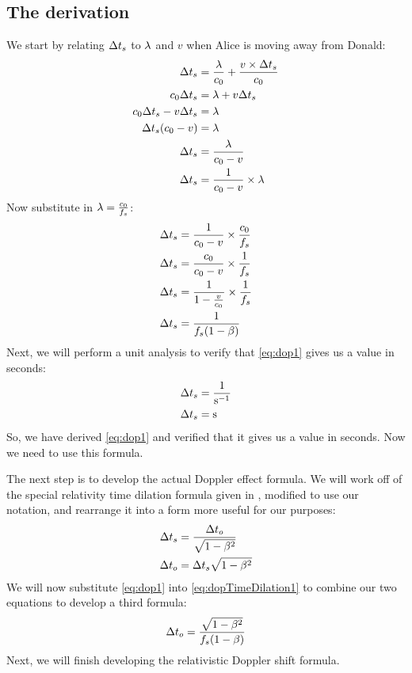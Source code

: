 	\subsection{The derivation}
		We start by relating $\mathrm{\Delta} t_s$ to $\mathrm{\lambda}$ and $v$ when Alice is moving away from Donald:
		\begin{align*}
			\Del t_s &= \frac{\lam}{\si{\clight}} + \frac{v \times \Del t_s}{\si{\clight}}\\
			\si{\clight} \Del t_s &= \lam + v\Del t_s\\
			\si{\clight} \Del t_s - v\Delta t_s &= \lam\\
			\Del t_s (\si{\clight} - v) &= \lam\\
			\Del t_s &= \frac{\lam}{\si{\clight} - v}\\
			\Del t_s &= \frac{1}{\si{\clight} - v} \times \lam
		\end{align*}
		Now substitute in $\lam = \frac{\si{\clight}}{f_s}$:
		\begin{align}
			\Del t_s &= \frac{1}{\si{\clight} - v} \times \frac{\si{\clight}}{f_s}\nonumber\\
			\Del t_s &= \frac{\si{\clight}}{\si{\clight} - v} \times \frac{1}{f_s}\nonumber\\
			\Del t_s &= \frac{1}{1 - \frac{v}{\si{\clight}}} \times \frac{1}{f_s}\nonumber\\
			\Del t_s &= \frac{1}{f_s(1 - \beta)}\label{eq:dop1}
		\end{align}
		Next, we will perform a unit analysis to verify that \eqref{eq:dop1} gives us a value in seconds:
		\begin{align*}
			\mathrm{\Delta} t_s &= \frac{1}{\si{\per\second}}\\
			\mathrm{\Delta} t_s &= \si{\second}
		\end{align*}
		So, we have derived \eqref{eq:dop1} and verified that it gives us a value in seconds.
		Now we need to use this formula.

		The next step is to develop the actual Doppler effect formula.
		We will work off of the special relativity time dilation formula given in \cite[\pno~593]{textbook}, modified to use our notation, and rearrange it into a form more useful for our purposes:
		\begin{align}
			\mathrm{\Delta} t_s &= \frac{\mathrm{\Delta} t_o}{\sqrt{1 - \beta^2}}\nonumber\\
			\mathrm{\Delta} t_o &= \mathrm{\Delta} t_s\sqrt{1 - \beta^2}\label{eq:dopTimeDilation1}
		\end{align}
		We will now substitute \eqref{eq:dop1} into \eqref{eq:dopTimeDilation1} to combine our two equations to develop a third formula:
		\begin{equation}\label{eq:dop3}
			\mathrm{\Delta} t_o = \frac{\sqrt{1 - \beta^2}}{f_s(1 - \beta)}
		\end{equation}
		Next, we will finish developing the relativistic Doppler shift formula.

